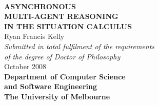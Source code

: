 %
%







\begin{titlepage}
\begin{center}
%
%
\ \\
\vspace{2cm}
{\bf\LARGE  ASYNCHRONOUS }\\ \vspace{0.5cm}
{\bf\LARGE  MULTI-AGENT REASONING }\\ \vspace{0.5cm}
{\bf\LARGE  IN THE SITUATION CALCULUS } \\
\vspace{3cm}
{\LARGE      Ryan Francis Kelly       }\\
\vspace{5cm}
{\em\large Submitted in total fulfilment of the requirements}\\ \vspace{0.1cm}
{\em\large        of the degree of Doctor of Philosophy     }\\
\vspace{0.5cm}
{\Large             October 2008        }\\
\vspace{2.5cm}
{\bf\large Department of Computer Science\\ and Software Engineering}\\ \vspace{0.5cm}
{\bf\Large        The University of Melbourne     }\\
\vspace{0.5cm}
%
%

\end{center}
\end{titlepage}

